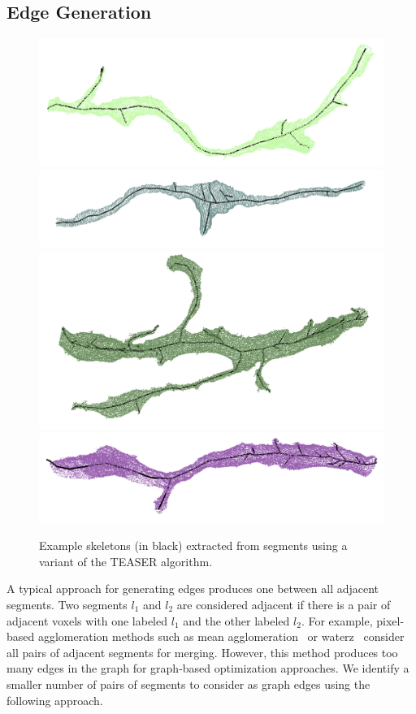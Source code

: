 \subsection{Edge Generation}

\begin{figure}[t]
	\centering
	\includegraphics[width=0.45\linewidth]{./figures/skeleton1.png}
	\includegraphics[width=0.45\linewidth]{./figures/skeleton2.png}
	\includegraphics[width=0.45\linewidth]{./figures/skeleton3.png}
	\includegraphics[width=0.45\linewidth]{./figures/skeleton4.png}
	\caption{Example skeletons (in black) extracted from segments using a variant of the TEASER algorithm.}
	\label{fig:skeletonization}
\end{figure}

A typical approach for generating edges produces one between all adjacent segments. Two segments $l_1$ and $l_2$ are considered adjacent if there is a pair of adjacent voxels with one labeled $l_1$ and the other labeled $l_2$.
For example, pixel-based agglomeration methods such as mean agglomeration~\cite{lee2017superhuman} or waterz~\cite{funke2017deep} consider all pairs of adjacent segments for merging.
However, this method produces too many edges in the graph for graph-based optimization approaches. 
We identify a smaller number of pairs of segments to consider as graph edges using the following approach.

